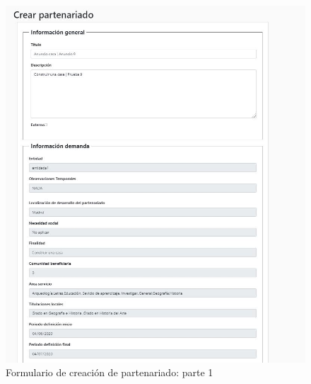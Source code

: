 \documentclass[11pt]{article}
\begin{document}
\begin{figure}
	\centering
	\includegraphics[scale=0.9]{partenariado1}
	\caption{Formulario de creación de partenariado: parte 1}
\end{figure}
\end{document}
